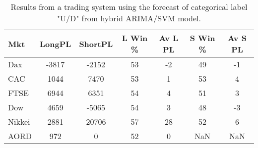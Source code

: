 \begin{table}[ht]
\centering
\caption[Results from a trading system using the forecast of categorical label "U/D" from hybrid ARIMA/SVM model]{Results from a trading system using the forecast of categorical label "U/D" from hybrid ARIMA/SVM model.} 
\label{tab:chp_ts:pUD_CAT_arima_svm_sys}
\begin{tabular}{lcccccc}
  \toprule Mkt & LongPL & ShortPL & L Win \% & Av L PL & S Win \% & Av S PL \\ 
  \midrule Dax & -3817 & -2152 & 53 & -2 & 49 & -1 \\ 
  CAC & 1044 & 7470 & 53 & 1 & 53 & 4 \\ 
  FTSE & 6944 & 6351 & 54 & 4 & 51 & 3 \\ 
  Dow & 4659 & -5065 & 54 & 3 & 48 & -3 \\ 
  Nikkei & 2881 & 20706 & 57 & 28 & 52 & 6 \\ 
  AORD & 972 & 0 & 52 & 0 & NaN & NaN \\ 
   \bottomrule \end{tabular}
\end{table}
